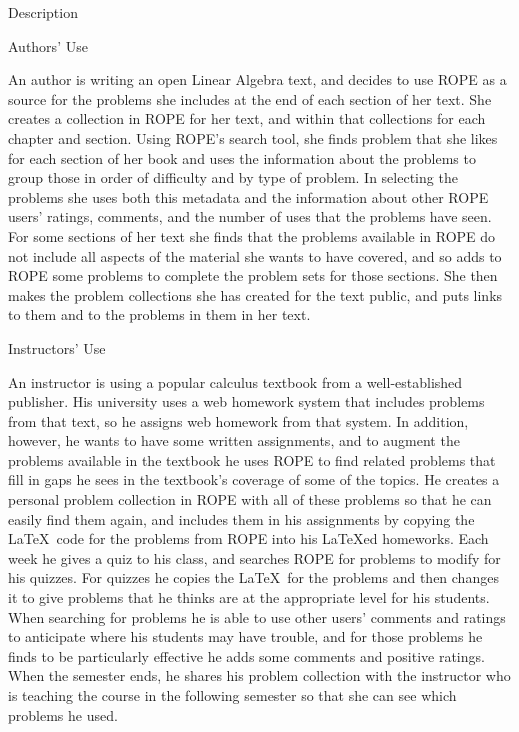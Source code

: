 \documentclass[11pt]{article}
\begin{document}
\begin{section}{Description}
\begin{subsection}{Authors' Use}

An author is writing an open Linear Algebra text, and decides to use ROPE
as a source for the problems she includes at the end of each section of
her text.  She creates a collection in ROPE for her text, and within that
collections for each chapter and section.  Using ROPE's search tool, she
finds problem that she likes for each section of her book and uses the
information about the problems to group those in order of difficulty and
by type of problem.  In selecting the problems she uses both this metadata
and the information about other ROPE users' ratings, comments, and the
number of uses that the problems have seen.  For some sections of her
text she finds that the problems available in ROPE do not include all
aspects of the material she wants to have covered, and so adds to ROPE
some problems to complete the problem sets for those sections.  She then
makes the problem collections she has created for the text public, and
puts links to them and to the problems in them in her text.

\end{subsection}

\begin{subsection}{Instructors' Use}

An instructor is using a popular calculus textbook from a well-established
publisher.  His university uses a web homework system that includes
problems from that text, so he assigns web homework from that system.  In
addition, however, he wants to have some written assignments, and to
augment the problems available in the textbook he uses ROPE to find
related problems that fill in gaps he sees in the textbook's coverage of
some of the topics.  He creates a personal problem collection in ROPE with
all of these problems so that he can easily find them again, and includes
them in his assignments by copying the \LaTeX\ code for the problems from
ROPE into his \LaTeX ed homeworks.  Each week he gives a quiz to his
class, and searches ROPE for problems to modify for his quizzes.  For
quizzes he copies the \LaTeX\ for the problems and then changes it to give
problems that he thinks are at the appropriate level for his students.
When searching for problems he is able to use other users' comments and
ratings to anticipate where his students may have trouble, and for those
problems he finds to be particularly effective he adds some comments and
positive ratings.  When the semester ends, he shares his problem
collection with the instructor who is teaching the course in the following
semester so that she can see which problems he used.


\end{subsection}
\end{section}
\end{document}
